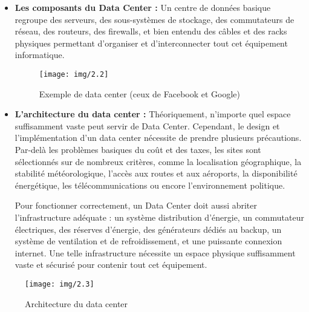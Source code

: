 \begin{itemize}
\item  \textbf{Les composants du Data Center :} Un centre de données basique regroupe des serveurs, des sous-systèmes de stockage, des commutateurs de réseau, des routeurs, des firewalls, et bien entendu des câbles et des racks physiques permettant d'organiser et d'interconnecter tout cet équipement informatique.
\begin{figure}[h]
	\centering
	\texttt{[image: img/2.2]}
	\caption{Exemple de data center (ceux de Facebook et Google)}
\end{figure}
\bigskip \bigskip \bigskip \bigskip
\item  \textbf{L'architecture du data center :} Théoriquement, n'importe quel espace suffisamment vaste peut servir de Data Center. Cependant, le design et l'implémentation d'un data center nécessite de prendre plusieurs précautions. Par-delà les problèmes basiques du coût et des taxes, les sites sont sélectionnés sur de nombreux critères, comme la localisation géographique, la stabilité météorologique, l'accès aux routes et aux aéroports, la disponibilité énergétique, les télécommunications ou encore l'environnement politique.

Pour fonctionner correctement, un Data Center doit aussi abriter l'infrastructure adéquate : un système distribution d'énergie, un commutateur électriques, des réserves d'énergie, des générateurs dédiés au backup, un système de ventilation et de refroidissement, et une puissante connexion internet. Une telle infrastructure nécessite un espace physique suffisamment vaste et sécurisé pour contenir tout cet équipement.
\end{itemize}
\begin{figure}[h]
	\centering
	\texttt{[image: img/2.3]}
	\caption{Architecture du data center}
\end{figure}




